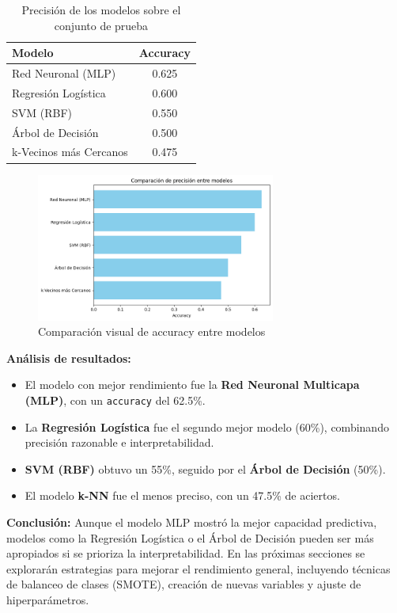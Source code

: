\documentclass[11pt,a4paper]{article}
\begin{document}
\begin{table}[H]
\centering
\begin{tabular}{lc}
\toprule
\textbf{Modelo} & \textbf{Accuracy} \\
\midrule
Red Neuronal (MLP) & 0.625 \\
Regresión Logística & 0.600 \\
SVM (RBF) & 0.550 \\
Árbol de Decisión & 0.500 \\
k-Vecinos más Cercanos & 0.475 \\
\bottomrule
\end{tabular}
\caption*{Precisión de los modelos sobre el conjunto de prueba}
\end{table}

\begin{figure}[H]
\centering
\includegraphics[width=0.7\textwidth]{img/accuracy_modelos_basicos.png}
\caption*{Comparación visual de accuracy entre modelos}
\end{figure}

\medskip

\noindent\textbf{Análisis de resultados:}
\begin{itemize}
    \item El modelo con mejor rendimiento fue la \textbf{Red Neuronal Multicapa (MLP)}, con un \texttt{accuracy} del 62.5\%.
    \item La \textbf{Regresión Logística} fue el segundo mejor modelo (60\%), combinando precisión razonable e interpretabilidad.
    \item \textbf{SVM (RBF)} obtuvo un 55\%, seguido por el \textbf{Árbol de Decisión} (50\%).
    \item El modelo \textbf{k-NN} fue el menos preciso, con un 47.5\% de aciertos.
\end{itemize}

\medskip

\noindent\textbf{Conclusión:}  
Aunque el modelo MLP mostró la mejor capacidad predictiva, modelos como la Regresión Logística o el Árbol de Decisión pueden ser más apropiados si se prioriza la interpretabilidad. En las próximas secciones se explorarán estrategias para mejorar el rendimiento general, incluyendo técnicas de balanceo de clases (SMOTE), creación de nuevas variables y ajuste de hiperparámetros.
\end{document}
